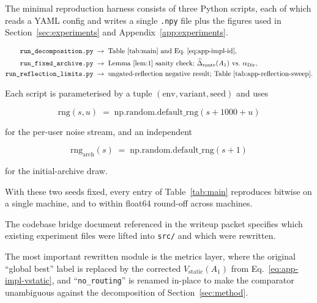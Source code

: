 \documentclass{article} %
\begin{document}
\label{app:impl-repro}

The minimal reproduction harness consists of three Python scripts, each of which reads a YAML config and writes a single \texttt{.npy} file plus the figures used in Section~\ref{sec:experiments} and Appendix~\ref{app:experiments}.

\begin{align}
\label{eq:app-impl-h1}
\texttt{run\_decomposition.py} &\;\rightarrow\; \text{Table~\ref{tab:main} and Eq.~\eqref{eq:app-impl-id}},\\
\label{eq:app-impl-h2}
\texttt{run\_fixed\_archive.py} &\;\rightarrow\; \text{Lemma~\ref{lem:1} sanity check; }\widehat\Delta_{\mathrm{route}}(A_1)\text{ vs.\ }\alpha_{\mathrm{Dir}},\\
\label{eq:app-impl-h3}
\texttt{run\_reflection\_limits.py} &\;\rightarrow\; \text{ungated-reflection negative result; Table~\ref{tab:app-reflection-sweep}}.
\end{align}

Each script is parameterised by a tuple $(\text{env}, \text{variant}, \text{seed})$ and uses

\begin{equation}
\label{eq:app-impl-rngseed}
\text{rng}(s, u) \;=\; \mathrm{np.random.default\_rng}(s + 1000 + u)
\end{equation}

for the per-user noise stream, and an independent

\begin{equation}
\label{eq:app-impl-rngarch}
\text{rng}_{\text{arch}}(s) \;=\; \mathrm{np.random.default\_rng}(s + 1)
\end{equation}

for the initial-archive draw.

With these two seeds fixed, every entry of Table~\ref{tab:main} reproduces bitwise on a single machine, and to within float64 round-off across machines.

The codebase bridge document referenced in the writeup packet specifies which existing experiment files were lifted into \texttt{src/} and which were rewritten.

The most important rewritten module is the metrics layer, where the original ``global best'' label is replaced by the corrected $\widehat V_{\mathrm{static}}(A_1)$ from Eq.~\eqref{eq:app-impl-vstatic}, and ``\texttt{no\_routing}'' is renamed in-place to make the comparator unambiguous against the decomposition of Section~\ref{sec:method}.
\end{document}
